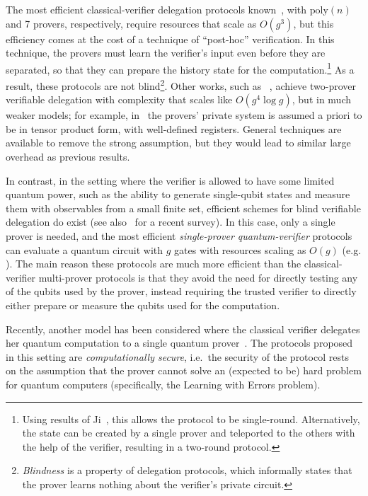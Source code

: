 The most efficient classical-verifier delegation protocols known~\cite{hajdusek2015posthoc,natarajan2016robust}, with $\mathrm{poly}(n)$ and 7 provers, respectively,
require resources that scale as $O(g^3)$, but this efficiency comes at the cost of a technique of ``post-hoc''
verification. In this technique, the provers must learn the
verifier's input even before they are separated, so that they can prepare the
history state for the computation.\footnote{Using results of Ji~\cite{Ji16},
this allows the protocol to be single-round. Alternatively, the state can be created by a single prover and teleported to the others with the help of the verifier, resulting in a two-round protocol.} As a result, these protocols are not blind\footnote{
\emph{Blindness} is a property of delegation protocols, which informally states that the prover learns nothing about the verifier's private circuit.}. 
Other works, such as ~\cite{HayashiH16},
achieve two-prover verifiable delegation with complexity that scales like $O(g^4\log g)$,  but in much weaker models; for example, in~\cite{HayashiH16} the provers' private system is assumed a priori to be in tensor product form, with well-defined registers.  General techniques are available to remove the strong assumption, but they would lead to similar large overhead as previous results.

In contrast, in the setting where the verifier is allowed to have some limited quantum power, such as the ability to generate single-qubit states and measure them with observables from a small finite set, efficient schemes for blind verifiable delegation do exist \cite{aharonov10qpip,fitzsimons12vubqc,Morimae14,broadbent15howtoverify,HayashiM15,MF16,FujiiH17,MorimaeTH17} (see also~\cite{fitzsimons2016survey} for a recent survey). In this case, only a single prover is needed, and the most efficient \emph{single-prover quantum-verifier} protocols can evaluate a quantum circuit with $g$ gates with resources scaling as $O(g)$ (e.g. \cite{broadbent15howtoverify}). The main reason these protocols are much more efficient than the classical-verifier multi-prover protocols is that they avoid the need for directly testing any of the qubits used by the prover, instead requiring the trusted verifier to directly either prepare or measure the qubits used for the computation. 


Recently, another model has been considered where the classical verifier delegates her quantum computation to a single quantum prover~\cite{mahadev2018,GheorghiuV19}. The protocols proposed in this setting are {\em computationally secure}, i.e.\ the security of the protocol rests on the assumption that the prover cannot solve an (expected to be) hard problem for quantum computers (specifically, the Learning with Errors problem). 


